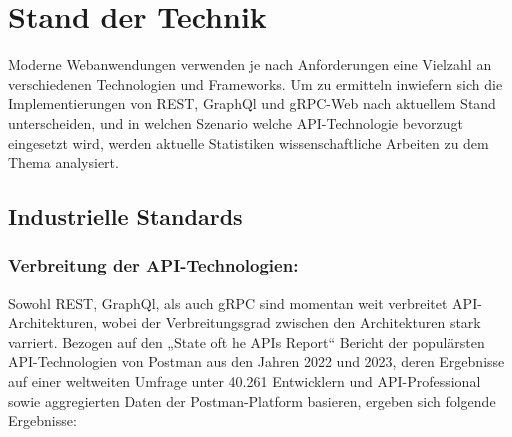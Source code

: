 \chapter{Stand der Technik}
\label{chap:intro}

Moderne Webanwendungen verwenden je nach Anforderungen eine Vielzahl an verschiedenen Technologien und Frameworks. Um zu ermitteln inwiefern sich die Implementierungen von REST, GraphQl und gRPC-Web nach aktuellem Stand unterscheiden, und in welchen Szenario welche API-Technologie bevorzugt eingesetzt wird, werden aktuelle Statistiken wissenschaftliche Arbeiten zu dem Thema analysiert.

\chapterstart
\section{Industrielle Standards}
\subsection{Verbreitung der API-Technologien:}
Sowohl REST, GraphQl, als auch gRPC sind momentan weit verbreitet API-Architekturen, wobei der Verbreitungsgrad zwischen den Architekturen stark varriert. Bezogen auf den „State oft he APIs Report“ Bericht der populärsten API-Technologien von Postman aus den Jahren 2022 und 2023, deren Ergebnisse auf einer weltweiten Umfrage unter 40.261 Entwicklern und API-Professional sowie aggregierten Daten der Postman-Platform basieren, ergeben sich folgende Ergebnisse:

